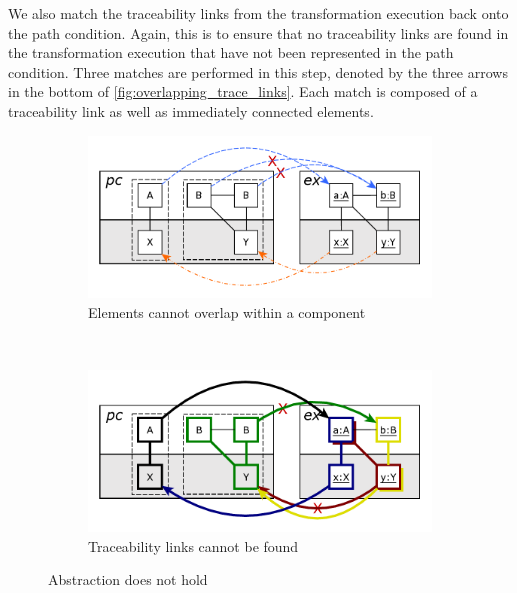 We also match the traceability links from the transformation execution back onto the path condition. Again, this is to ensure that no traceability links are found in the transformation execution that have not been represented in the path condition. Three matches are performed in this step, denoted by the three arrows in the bottom of \cref{fig:overlapping_trace_links}. Each match is composed of a traceability link as well as immediately connected elements.

\begin{figure}[htb]
        \centering
        \begin{subfigure}[b]{0.40\textwidth}
                \centering
                \includegraphics[width=1\textwidth]{./figures/abstraction_relation/overlapping2.pdf}
               	\caption{Elements cannot overlap within a component}
               	\label{fig:overlapping2_match_apply}
        \end{subfigure}%
        ~~\\
        \begin{subfigure}[b]{0.40\textwidth}
                \centering
                \includegraphics[width=1\textwidth]{./figures/abstraction_relation/overlapping2_trace_links.pdf}
                \caption{Traceability links cannot be found}
                \label{fig:overlapping2_trace_links}
        \end{subfigure}%
        \caption{Abstraction does not hold}
        \label{fig:overlapping2}
\end{figure}


